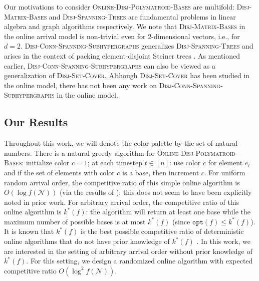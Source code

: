 \documentclass[11pt]{article}
\theoremstyle{definition}
\newcommand{\calN}{{\mathcal{N}}}
\newcommand{\cnote}[1]{{\bf{\color{magenta}[Chandra: #1]}}}
\newcommand{\DPB}{\textsc{Disj-Polymatroid-Bases}\xspace}
\newcommand{\ODPB}{\textsc{Online-Disj-Polymatroid-Bases}\xspace}
\newcommand{\DSC}{\textsc{Disj-Set-Cover}\xspace}
\newcommand{\MatrixDB}{\textsc{Disj-Matrix-Bases}\xspace}
\newcommand{\DST}{\textsc{Disj-Spanning-Trees}\xspace}
\newcommand{\DCSS}{\textsc{Disj-Conn-Spanning-Subhypergraphs}\xspace}
\newcommand{\opt}{\texttt{opt}}
\begin{document}
Our motivations to consider \ODPB are multifold: 
\MatrixDB and \DST are fundamental problems in linear algebra and graph algorithms respectively. 
We note that \MatrixDB in the online arrival model is non-trivial even for $2$-dimensional vectors, i.e., for $d=2$.
\DCSS generalizes \DST and arises in the context of packing element-disjoint Steiner trees \cite{CS07}. 
As mentioned earlier, \DCSS can also be viewed as a generalization of \DSC. 
Although \DSC has been studied in the online model, there has not been any work on \DCSS in the online model. 
\iffalse
Secondly, what is the competitive ratio of \DPB in the online model? \DPB is a generalization of numerous set packing problems and its approximability in the offline setting is well understood. Given this status, it is natural to investigate \DPB in the online model. 
\cnote{This para seems repetitive. We should shorten it and be more direct.}
\fi

\subsection{Our Results}\label{sec:results}
\iffalse
Let $\texttt{Alg}(f)$ be the number of proper colors obtained by an online algorithm $\texttt{Alg}$ for a given polymatroid $f$. A deterministic algorithm $\texttt{Alg}$ is \emph{(purely) $\alpha$-competitive} if for every polymatroid $f$, we have
\begin{equation}
    \texttt{Alg}(f)\geq \frac{\texttt{Opt}(f)}{\alpha}. \label{def:competitive-ratio}
\end{equation}
A randomized algorithm is \emph{$\alpha$-competitive} if the bound in (\ref{def:competitive-ratio}) holds in expectation. 
\fi
Throughout this work, we will denote the color palette by the set of natural numbers. 
There is a natural greedy algorithm for \ODPB: initialize color $c=1$; at each timestep $t\in [n]$: use color $c$ for element $e_t$ and if the set of elements with color $c$ is a base, then increment $c$. 
For uniform random arrival order, the competitive ratio of this simple online algorithm is $O(\log{f(\calN)})$ (via the results of \cite{CCV09}); this does not seem to have been explicitly noted in prior work. 
For arbitrary arrival order, the competitive ratio of this online algorithm is $k^*(f)$: the algorithm will return at least one base while the maximum number of possible bases is at most $k^*(f)$ (since $\opt(f)\le k^*(f)$). It is known that $k^*(f)$ is the best possible competitive ratio of deterministic online algorithms that do not have prior knowledge of $k^*(f)$ \cite{PBV15}. 
In this work, we are interested in the setting of arbitrary arrival order without prior knowledge of $k^*(f)$. For this setting, we design a randomized online algorithm with expected competitive ratio $O(\log^2 {f(\calN)})$. 
\end{document}
